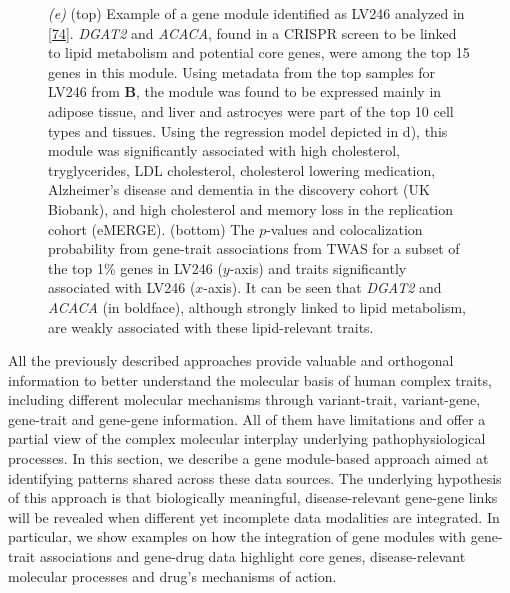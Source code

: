 \begin{figure}
{{\emph{(e)} (top) Example of a gene module identified as LV246 analyzed in {[}\protect\hyperlink{ref-NM3rHx1i}{74}{]}.
\emph{DGAT2} and \emph{ACACA}, found in a CRISPR screen to be linked to lipid metabolism and potential core genes, were among the top 15 genes in this module.
Using metadata from the top samples for LV246 from \(\mathbf{B}\), the module was found to be expressed mainly in adipose tissue, and liver and astrocyes were part of the top 10 cell types and tissues.
Using the regression model depicted in d), this module was significantly associated with high cholesterol, tryglycerides, LDL cholesterol, cholesterol lowering medication, Alzheimer's disease and dementia in the discovery cohort (UK Biobank), and high cholesterol and memory loss in the replication cohort (eMERGE).
(bottom) The \(p\)-values and colocalization probability from gene-trait associations from TWAS for a subset of the top 1\% genes in LV246 (\(y\)-axis) and traits significantly associated with LV246 (\(x\)-axis).
It can be seen that \emph{DGAT2} and \emph{ACACA} (in boldface), although strongly linked to lipid metabolism, are weakly associated with these lipid-relevant traits.}\label{fig:fig4}
}
\end{figure}

All the previously described approaches provide valuable and orthogonal information to better understand the molecular basis of human complex traits, including different molecular mechanisms through variant-trait, variant-gene, gene-trait and gene-gene information.
All of them have limitations and offer a partial view of the complex molecular interplay underlying pathophysiological processes.
In this section, we describe a gene module-based approach aimed at identifying patterns shared across these data sources.
The underlying hypothesis of this approach is that biologically meaningful, disease-relevant gene-gene links will be revealed when different yet incomplete data modalities are integrated.
In particular, we show examples on how the integration of gene modules with gene-trait associations and gene-drug data highlight core genes, disease-relevant molecular processes and drug's mechanisms of action.

